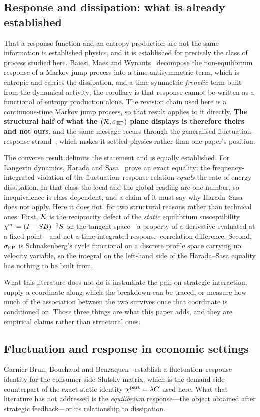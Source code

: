 \subsection{Response and dissipation: what is already established}
\label{sec:bg:priorart}
That a response function and an entropy production are not the same information is
established physics, and it is established for precisely the class of process studied here.
Baiesi, Maes and Wynants~\cite{baiesi2009} decompose the non-equilibrium response of a Markov
jump process into a time-antisymmetric term, which is entropic and carries the dissipation,
and a time-symmetric \emph{frenetic} term built from the dynamical activity; the corollary is
that response cannot be written as a functional of entropy production alone. The revision
chain used here is a continuous-time Markov jump process, so that result applies to it
directly. \textbf{The structural half of what the $(\mathcal{R},\sigma_{\mathrm{EP}})$ plane displays is therefore
theirs and not ours}, and the same message recurs through the generalised
fluctuation--response strand~\cite{seifert2012}, which makes it settled physics rather than
one paper's position.

The converse result delimits the statement and is equally established. For Langevin dynamics,
Harada and Sasa~\cite{haradasasa2005} prove an exact equality: the frequency-integrated
violation of the fluctuation--response relation \emph{equals} the rate of energy dissipation.
In that class the local and the global reading are one number, so inequivalence is
class-dependent, and a claim of it must say why Harada--Sasa does not apply. Here it does not,
for two structural reasons rather than technical ones. First, $\mathcal{R}$ is the reciprocity defect
of the \emph{static} equilibrium susceptibility $\chi^{\mathrm{eq}}=(I-SB)^{-1}S$ on the tangent
space---a property of a derivative evaluated at a fixed point---and not a time-integrated
response--correlation difference. Second, $\sigma_{\mathrm{EP}}$ is Schnakenberg's cycle functional on a
discrete profile space carrying no velocity variable, so the integral on the left-hand side of
the Harada--Sasa equality has nothing to be built from.

What this literature does not do is instantiate the pair on strategic interaction, supply a
coordinate along which the breakdown can be traced, or measure how much of the association
between the two survives once that coordinate is conditioned on. Those three things are what
this paper adds, and they are empirical claims rather than structural ones.

\subsection{Fluctuation and response in economic settings}
Garnier-Brun, Bouchaud and Benzaquen~\cite{garnierbrun2023} establish a
fluctuation--response identity for the consumer-side Slutsky matrix, which is the
demand-side counterpart of the exact static identity $\chi^{\mathrm{part}}=\lambda C$ used here. What
that literature has not addressed is the \emph{equilibrium} response---the object obtained
after strategic feedback---or its relationship to dissipation.

